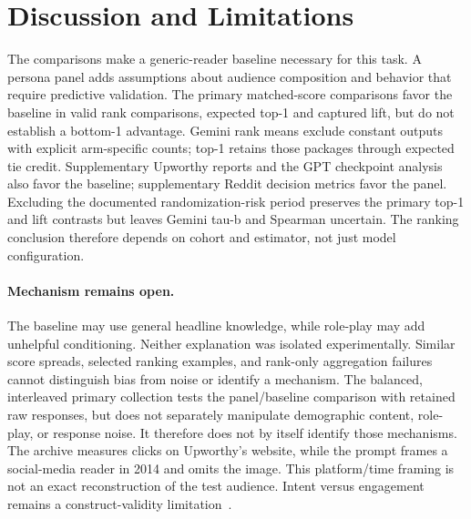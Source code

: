 \section{Discussion and Limitations}
The comparisons make a generic-reader baseline necessary for this task. A persona panel adds
assumptions about audience composition and behavior that require predictive validation.
The primary matched-score comparisons favor the baseline in valid rank comparisons, expected top-1
and captured lift, but do not establish a bottom-1 advantage. Gemini rank means exclude constant
outputs with explicit arm-specific counts; top-1 retains those packages through expected tie
credit. Supplementary Upworthy reports and the GPT checkpoint analysis also favor the baseline;
supplementary Reddit decision metrics favor the panel. Excluding the documented randomization-risk
period preserves the primary top-1 and lift contrasts but leaves Gemini tau-b and Spearman uncertain.
The ranking conclusion therefore depends on cohort and estimator, not just model configuration.

\paragraph{Mechanism remains open.}
The baseline may use general headline knowledge, while role-play may add unhelpful conditioning.
Neither explanation was isolated experimentally. Similar score spreads, selected ranking examples,
and rank-only aggregation failures cannot distinguish bias from noise or identify a mechanism.
The balanced, interleaved primary collection tests the panel/baseline comparison with retained raw
responses, but does not separately manipulate demographic content, role-play, or response noise.
It therefore does not by itself identify those mechanisms.
The archive measures clicks on Upworthy's website, while the prompt frames a social-media
reader in 2014 and omits the image. This platform/time framing is not an exact reconstruction
of the test audience. Intent versus engagement remains a construct-validity limitation~\citep{cronbach1955construct}.

